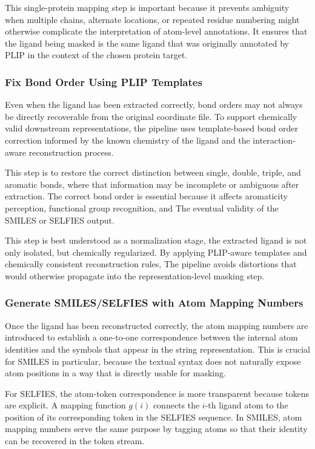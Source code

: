 \documentclass[a4paper,12pt]{article}
\begin{document}
This single-protein mapping step is important because it prevents ambiguity
when multiple chains, alternate locations, or repeated residue numbering might
otherwise complicate the interpretation of atom-level annotations. It ensures
that the ligand being masked is the same ligand that was originally annotated
by PLIP in the context of the chosen protein target.

\subsubsection{Fix Bond Order Using PLIP Templates}

Even when the ligand has been extracted correctly, bond orders may not always
be directly recoverable from the original coordinate file. To support chemically
valid downstream representations, the pipeline uses template-based bond
order correction informed by the known chemistry of the ligand and the
interaction-aware reconstruction process.

This step is to restore the correct distinction between single, double, triple, and aromatic bonds, where that information may
be incomplete or ambiguous after extraction. The correct bond order is essential
because it affects aromaticity perception, functional group recognition, and
The eventual validity of the SMILES or SELFIES output.

This step is best understood as a normalization
stage, the extracted ligand is not only isolated, but chemically regularized.
By applying PLIP-aware templates and chemically consistent reconstruction rules,
The pipeline avoids distortions that would otherwise propagate into the
representation-level masking step.

\subsubsection{Generate SMILES/SELFIES with Atom Mapping Numbers}

Once the ligand has been reconstructed correctly, the atom mapping numbers are
introduced to establish a one-to-one correspondence between the internal atom
identities and the symbols that appear in the string representation. This is
crucial for SMILES in particular, because the textual syntax does not naturally
expose atom positions in a way that is directly usable for masking.

For SELFIES, the atom-token correspondence is more transparent because tokens
are explicit. A mapping function $g(i)$ connects the $i$-th ligand atom to the
position of its corresponding token in the SELFIES sequence. In SMILES, atom
mapping numbers serve the same purpose by tagging atoms so that their identity
can be recovered in the token stream.
\end{document}
